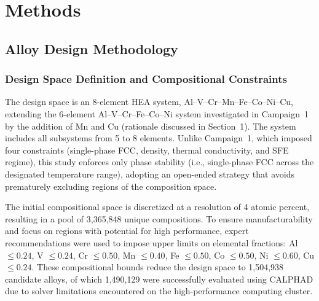 \section{Methods}\label{sec:Material and methods}

\subsection{Alloy Design Methodology}

\subsubsection{Design Space Definition and Compositional Constraints}

The design space is an 8-element HEA system, Al--V--Cr--Mn--Fe--Co--Ni--Cu, extending the 6-element Al--V--Cr--Fe--Co--Ni system investigated in Campaign~1~\cite{hastings2025accelerated} by the addition of Mn and Cu (rationale discussed in Section~1). The system includes all subsystems from 5 to 8 elements. Unlike Campaign~1, which imposed four constraints (single-phase FCC, density, thermal conductivity, and SFE regime), this study enforces only phase stability (i.e., single-phase FCC across the designated temperature range), adopting an open-ended strategy that avoids prematurely excluding regions of the composition space.

The initial compositional space is discretized at a resolution of 4 atomic percent, resulting in a pool of 3,365,848 unique compositions. To ensure manufacturability and focus on regions with potential for high performance, expert recommendations were used to impose upper limits on elemental fractions: Al $\leq 0.24$, V $\leq 0.24$, Cr $\leq 0.50$, Mn $\leq 0.40$, Fe $\leq 0.50$, Co $\leq 0.50$, Ni $\leq 0.60$, Cu $\leq 0.24$. These compositional bounds reduce the design space to 1,504,938 candidate alloys, of which 1,490,129 were successfully evaluated using CALPHAD due to solver limitations encountered on the high-performance computing cluster.



